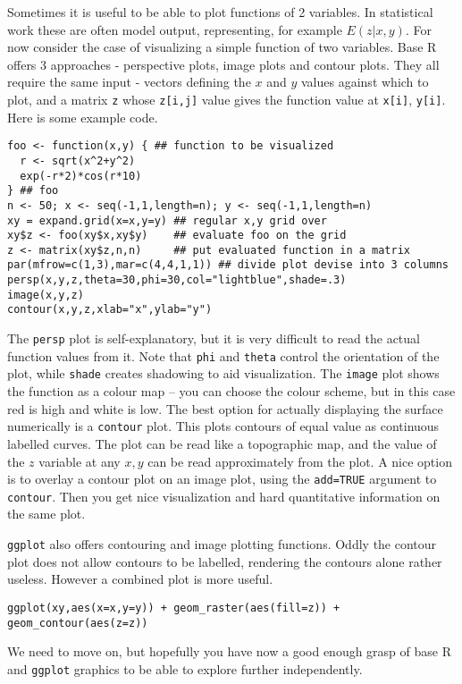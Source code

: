 \documentclass[10pt] {article}
\newcommand{\eps}[3]
{{\begin{center}
 \rotatebox{#1}{\scalebox{#2}{\texttt{[image: \#3]}}}
 \end{center}}
}
\theoremstyle{definition}
\begin{document}
Sometimes it is useful to be able to plot functions of 2 variables. In statistical work these are often model output, representing, for example $E(z|x,y)$. For now consider the case of visualizing a simple function of two variables. Base R offers 3 approaches - perspective plots, image plots and contour plots. They all require the same input - vectors defining the $x$ and $y$ values against which to plot, and a matrix {\tt z} whose \lstinline+z[i,j]+ value gives the function value at \lstinline+x[i]+, \lstinline+y[i]+. Here is some example code.
\begin{lstlisting}
foo <- function(x,y) { ## function to be visualized
  r <- sqrt(x^2+y^2)
  exp(-r*2)*cos(r*10)
} ## foo
n <- 50; x <- seq(-1,1,length=n); y <- seq(-1,1,length=n)
xy = expand.grid(x=x,y=y) ## regular x,y grid over 
xy$z <- foo(xy$x,xy$y)    ## evaluate foo on the grid
z <- matrix(xy$z,n,n)     ## put evaluated function in a matrix
par(mfrow=c(1,3),mar=c(4,4,1,1)) ## divide plot devise into 3 columns
persp(x,y,z,theta=30,phi=30,col="lightblue",shade=.3) 
image(x,y,z)
contour(x,y,z,xlab="x",ylab="y")
\end{lstlisting}
\eps{-90}{.5}{3d.eps} 
The \lstinline+persp+ plot is self-explanatory, but it is very difficult to read the actual function values from it. Note that \lstinline+phi+ and \lstinline+theta+ control the orientation of the plot, while \lstinline+shade+ creates shadowing to aid visualization. The \lstinline+image+ plot shows the function as a colour map -- you can choose the colour scheme, but in this case red is high and white is low. The best option for actually displaying the surface numerically is a \lstinline+contour+ plot. This plots contours of equal value as continuous labelled curves. The plot can be read like a topographic map, and the value of the $z$ variable at any $x,y$ can be read approximately from the plot. A nice option is to overlay a contour plot on an image plot, using the \lstinline+add=TRUE+ argument to \lstinline+contour+. Then you get nice visualization and hard quantitative information on the same plot.


{\tt ggplot} also offers contouring and image plotting functions. Oddly the contour plot does not allow contours to be labelled, rendering the contours alone rather useless. However a combined plot is more useful.
\begin{lstlisting}
ggplot(xy,aes(x=x,y=y)) + geom_raster(aes(fill=z)) + geom_contour(aes(z=z))
\end{lstlisting}
\eps{0}{.5}{gg-contour.eps} 
We need to move on, but hopefully you have now a good enough grasp of base R and {\tt ggplot} graphics to be able to explore further independently.
\printindex
\end{document}
